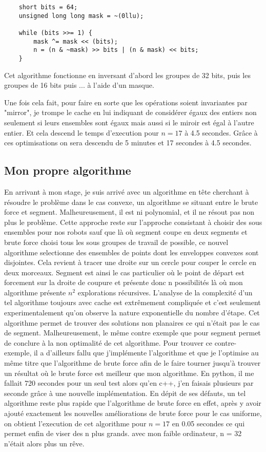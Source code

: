 \begin{verbatim}
	short bits = 64;
    unsigned long long mask = ~(0llu);

    while (bits >>= 1) {
        mask ^= mask << (bits);
        n = (n & ~mask) >> bits | (n & mask) << bits;
    }
\end{verbatim}

Cet algorithme fonctionne en inversant d'abord les groupes de 32 bits, puis les groupes de 16 bits puis ... à l'aide d'un masque.

Une fois cela fait, pour faire en sorte que les opérations soient invariantes par "mirror", je trompe le cache en lui indiquant de considérer égaux des entiers non seulement si leurs ensembles sont égaux mais aussi si le miroir est égal à l'autre entier. Et cela descend le temps d'execution pour $n = 17$ à 4.5 secondes.
Grâce à ces optimisations on sera descendu de 5 minutes et 17 secondes à 4.5 secondes.

\subsection{Mon propre algorithme}

En arrivant à mon stage, je suis arrivé avec un algorithme en tête cherchant à résoudre le problème dans le cas convexe, un algorithme se situant entre le brute force et segment. Malheureusement, il est ni polynomial, et il ne résout pas non plus le problème. Cette approche reste sur l'approche consistant à choisir des sous ensembles pour nos robots sauf que là où segment coupe en deux segments et brute force choisi tous les sous groupes de travail de possible, ce nouvel algorithme selectionne des ensembles de points dont les enveloppes convexes sont disjointes. Cela revient à tracer une droite sur un cercle pour couper le cercle en deux morceaux. Segment est ainsi le cas particulier où le point de départ est forcement sur la droite de coupure et présente donc n possibilités là où mon algorithme présente $n^2$ explorations récursives. L'analyse de la complexité d'un tel algorithme toujours avec cache est extrêmement compliquée et c'est seulement experimentalement qu'on observe la nature exponentielle du nombre d'étape. Cet algorithme permet de trouver des solutions non planaires ce qui n'était pas le cas de segment. Malheureusement, le même contre exemple que pour segment permet de conclure à la non optimalité de cet algorithme. Pour trouver ce contre-exemple, il a d'ailleurs fallu que j'implémente l'algorithme et que je l'optimise au même titre que l'algorithme de brute force afin de le faire tourner jusqu'à trouver un résultat où le brute force est meilleur que mon algorithme. En python, il me fallait 720 secondes pour un seul test alors qu'en c++, j'en faisais plusieurs par seconde grâce à une nouvelle implémentation.
En dépit de ses défauts, un tel algorithme reste plus rapide que l'algorithme de brute force en effet, après y avoir ajouté exactement les nouvelles améliorations de brute force pour le cas uniforme, on obtient l'execution de cet algorithme pour $n = 17$ en 0.05 secondes ce qui permet enfin de viser des n plus grands. avec mon faible ordinateur, n = 32 n'était alors plus un rêve.

